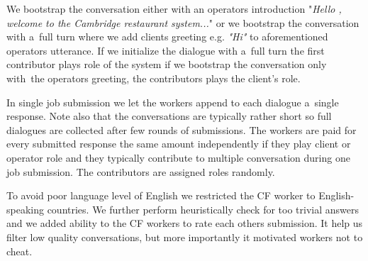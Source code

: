 \documentclass[runningheads,a4paper]{llncs}
\begin{document}
We bootstrap the conversation either with an operators introduction "{\it Hello , welcome to the Cambridge restaurant system...}" or we bootstrap the conversation with a~full turn where we add clients greeting e.g. {\it "Hi"} to aforementioned operators utterance.
If we initialize the dialogue with a~full turn the first contributor plays role of the system if we bootstrap the conversation only with~the operators greeting, the contributors plays the client's role.

In single job submission we let the workers append to each dialogue a~single response.
Note also that the conversations are typically rather short so full dialogues are collected after few rounds of submissions.
The workers are paid for every submitted response the same amount independently if they play client or operator role and they typically contribute to multiple conversation during one job submission.
The contributors are assigned roles randomly.

To avoid poor language level of English we restricted the CF worker to English-speaking countries.
We further perform heuristically check for too trivial answers and we added ability to the CF workers to rate each others submission.
It help us filter low quality conversations, but more importantly it motivated workers not to cheat.
\end{document}
